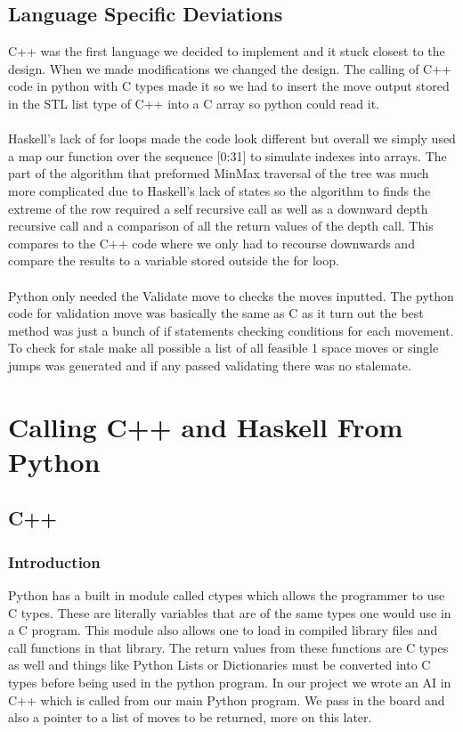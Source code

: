 \documentclass[12pt]{article}
\begin{document}
	\subsection{Language Specific Deviations}
        C++ was the first language we decided to implement and it stuck closest to the design. When we made modifications we changed the design. The calling of C++ code in python with C types made it so we had to insert the move output stored in the STL list type of C++ into a C array so python could read it.
    \\ \\
        Haskell's lack of for loops made the code look different but overall we simply used a map our function over the sequence [0:31] to simulate indexes into arrays. The part of the algorithm that preformed MinMax traversal of the tree was much more complicated due to Haskell's lack of states so the algorithm to finds the extreme of the row required a self recursive call as well as a downward depth recursive call and a comparison of all the return values of the depth call. This compares to the C++ code where we only had to recourse downwards and compare the results to a variable stored outside the for loop.
    \\ \\
        Python only needed the Validate move to checks the moves inputted. The python code for validation move was basically the same as C as it turn out the best method was just a bunch of if statements checking conditions for each movement. To check for stale make all possible a list of all feasible 1 space moves or single jumps was generated and if any passed validating there was no stalemate.

\section{Calling C++ and Haskell From Python}
    \subsection{C++}
        \subsubsection{Introduction}
            Python has a built in module called ctypes which allows the programmer
            to use C types. These are literally variables that are of the same types
            one would use in a C program. This module also allows one to load in compiled
            library files and call functions in that library. The return values from these
            functions are C types as well and things like Python Lists or Dictionaries must
            be converted into C types before being used in the python program. In our project
            we wrote an AI in C++ which is called from our main Python program. We pass in
            the board and also a pointer to a list of moves to be returned, more on this
            later.
\end{document}
